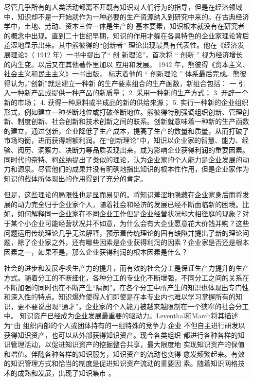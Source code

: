 \documentclass[12pt,a4paper]{ctexart}
\begin{document}
尽管几乎所有的人类活动都离不开既有知识对人们行为的指导，但是在经济领域中，知识却不是一开始就作为一种必要的生产资源纳入到研究中来的。在古典经济学中，土地、劳动、资本三位一体是生产的
基本要素，知识根本就没有在研究者的概念中出现。直到二十世纪早期，知识的作用才躲在各具特色的企业家理论背后羞涩地显示出来。其中熊彼得的“创新者”
理论出现最具有代表性。他在《经济发展理论》（ 1912 年）一书中提出了“ 创
新理论”，首次将 “ 创新 ” 视为经济增长的内生变。以后又在其他著作里加以
应用和发展。 1942 年，熊彼得《资本主义、社会主义和民主主义》一书出版，
标志着他的 “ 创新理论 ” 体系最后完成。熊彼得认为，”创新”就是建立一种新
的生产要素组合的生产函数，新组合包括： 一 引入一种新产品或提供一种产品的新质量； 2. 采用一种新的生产方式； 3. 开辟一个新的市场； 4. 获得一种原料或半成品的新的供给来源； 5. 实行一种新的企业组织形式，例如建立一种垄断地位或打破垄断地位。熊彼得特别强调组织创新、管理创新、制度创新、社会创新和技术创新之间的联系。创新就意味着一种新的生产函数的建立，通过创新，企业降低了生产成本，提高了生产的数量和质量，从而打破了市场均衡，进而获得超额利润。在“创新理论”中，知识以企业家的智慧、能力、经验、阅历、洞察力、决断力等品质表现出来，成为影响企业获得利润的重要因素。同时代的奈特、柯兹纳提出了类似的理论，认为企业家的个人能力是企业发展的动力和源泉。尽管他们的成果并没有明确地指出知识的根本性作用，但是企业家作为知识的载体所体现出的作用得到了充分的肯定。

但是，这些理论的局限性也是显而易见的。将知识羞涩地隐藏在企业家身后而将发展的动力完全归于企业家个人，随着社会和经济的发展已经不断面临新的困境。比如，如何解释同一企业家在不同企业工作但是企业经营状况却大相径庭的现象？对于某个小企业可能经营状况并不如意，为什么会有大企业愿意花大价钱并购？这些问题运用传统理论几乎无法解释，预示着传统理论的固有缺陷并提出了新的理论问题，除了企业家之外，还有哪些因素是企业获得利润的因素？企业家是否还是根本因素之一，如果不是，那么企业获得利润的根本因素是什么？

社会的进步和发展呼唤生产力的提升，而有效的社会分工是保证生产力提升的生产方式。随着分工的不断细化，各种分工的专业化不断增强，不同分工之间的关系在不断加强的同时也在不断产生“隔阂”。在各个分工中所产生的知识也体现出专门性和深入性的特点。知识爆炸使得人们即使是在本专业内也难以学习掌握所有的知识，更不要说出现“通才”。企业家的个人能力被越来越限制在一个狭窄的社会分工中。
知识资产已经成为企业发展最重要的驱动力。Leventhal和March将其描述为“由
组织内部的个人或团体持有的一组特殊的竞争力\cite{levinthal1993ml}.企业
不但自主进行研发以获得知识资产，也可以从外部获得知识资产。现今各类组织
都进行各种各样的知识管理活动，以促进知识资产的挖掘整合共享，最大限度地
实现知识资产的保值和增值。伴随各种各样的知识服务，知识资产的流动也变得
愈发频繁起来。有效的知识管理方式和恰当的制度是促进知识资产流动的重要因
素。随着知识网格技术的成熟和发展，出现了知识集市 。\cite{Andreas2007}
\end{document}
